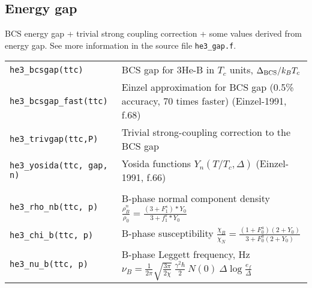 \documentclass[a4paper]{article}
\begin{document}
\subsection*{Energy gap}

BCS energy gap + trivial strong coupling correction + some values
derived from energy gap. See more information in the
source file {\tt he3\_gap.f}.

\medskip
\noindent\begin{tabular}{lp{12.5cm}}
\tt he3\_bcsgap(ttc)       & BCS gap for 3He-B in $T_c$ units, $\Delta_{\rm BCS}/ k_B T_c$\\
\tt he3\_bcsgap\_fast(ttc) & Einzel approximation for BCS gap (0.5\% accuracy, 70 times faster)\newline
                             {\small(Einzel-1991, f.68)}\\
\tt he3\_trivgap(ttc,P) & Trivial strong-coupling correction to the BCS gap\\
\tt he3\_yosida(ttc, gap, n) & Yosida functions $Y_n(T/T_c,\Delta)$\newline
{\small(Einzel-1991, f.66)}\\\\

\tt he3\_rho\_nb(ttc, p)     &B-phase normal component density\newline
                             $\displaystyle \frac{\rho_B^n}{\rho_0} =
                               \frac{(3 + F_1^s)*Y_0}{3 + f_1^s*Y_0}$\\
\tt he3\_chi\_b(ttc, p)      &B-phase susceptibility\newline
                             $\displaystyle \frac{\chi_B}{\chi_N} =
                               \frac{(1+F_0^a)(2 + Y_0)}
                                     {3+F_0^a(2 + Y_0)}$\\
\tt he3\_nu\_b(ttc, p)       &B-phase Leggett frequency, Hz\newline
                             $\displaystyle \nu_B =\frac{1}{2\pi}\sqrt{\frac{3\pi}{2\chi}}
                             \ \frac{\gamma^2\hbar}{2}\ N(0)\ \Delta \log\frac{e_f}{\Delta}  $\\


\end{tabular}
\medskip
\end{document}
